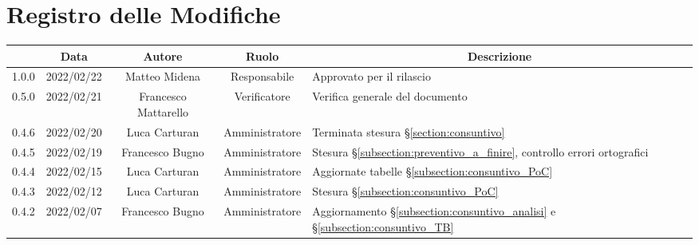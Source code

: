 \thispagestyle{empty}
\section*{Registro delle Modifiche}

\begin{center}
	\renewcommand{\arraystretch}{1.8}
	\begin{longtable}[c]{c | c | c | c | p{5cm}}
		\rowcolor[HTML]{125E28}
		\multicolumn{1}{c}{\color[HTML]{FFFFFF} \textbf{Versione}} &
		\multicolumn{1}{c}{\color[HTML]{FFFFFF} \textbf{Data}}     &
		\multicolumn{1}{c}{\color[HTML]{FFFFFF} \textbf{Autore}}   &
		\multicolumn{1}{c}{\color[HTML]{FFFFFF} \textbf{Ruolo}}    &
		\multicolumn{1}{c}{\color[HTML]{FFFFFF} \textbf{Descrizione}}                                                                                                                                                                                               \\
		\endhead

		1.0.0& 2022/02/22 & Matteo Midena & Responsabile & Approvato per il rilascio \\
		0.5.0& 2022/02/21 & Francesco Mattarello & Verificatore   & Verifica generale del documento \\
		0.4.6 & 2022/02/20 & Luca Carturan & Amministratore & Terminata stesura §\ref{section:consuntivo}\\
		0.4.5 & 2022/02/19 & Francesco Bugno & Amministratore & Stesura §\ref{subsection:preventivo_a_finire}, controllo errori ortografici \\
		0.4.4 & 2022/02/15 & Luca Carturan & Amministratore & Aggiornate tabelle §\ref{subsection:consuntivo_PoC} \\
		0.4.3 & 2022/02/12 & Luca Carturan & Amministratore & Stesura §\ref{subsection:consuntivo_PoC} \\
		0.4.2 & 2022/02/07 & Francesco Bugno & Amministratore & Aggiornamento §\ref{subsection:consuntivo_analisi} e §\ref{subsection:consuntivo_TB} \\
		

\end{longtable}
\end{center}
